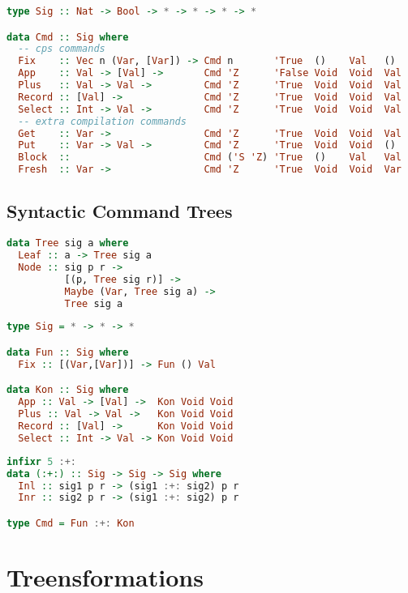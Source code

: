 \begin{lstlisting}[language=Haskell]
type Sig :: Nat -> Bool -> * -> * -> * -> *

data Cmd :: Sig where
  -- cps commands
  Fix    :: Vec n (Var, [Var]) -> Cmd n       'True  ()    Val   ()
  App    :: Val -> [Val] ->       Cmd 'Z      'False Void  Void  Val 
  Plus   :: Val -> Val ->         Cmd 'Z      'True  Void  Void  Val
  Record :: [Val] ->              Cmd 'Z      'True  Void  Void  Val
  Select :: Int -> Val ->         Cmd 'Z      'True  Void  Void  Val
  -- extra compilation commands
  Get    :: Var ->                Cmd 'Z      'True  Void  Void  Val
  Put    :: Var -> Val ->         Cmd 'Z      'True  Void  Void  ()
  Block  ::                       Cmd ('S 'Z) 'True  ()    Val   Val
  Fresh  :: Var ->                Cmd 'Z      'True  Void  Void  Var
\end{lstlisting}

\subsection{\label{subsection:syntree}Syntactic Command Trees}

\begin{lstlisting}[language=Haskell]
data Tree sig a where
  Leaf :: a -> Tree sig a
  Node :: sig p r ->
          [(p, Tree sig r)] ->
          Maybe (Var, Tree sig a) ->
          Tree sig a
\end{lstlisting}

\begin{lstlisting}[language=Haskell]
type Sig = * -> * -> *

data Fun :: Sig where
  Fix :: [(Var,[Var])] -> Fun () Val

data Kon :: Sig where
  App :: Val -> [Val] ->  Kon Void Void
  Plus :: Val -> Val ->   Kon Void Void
  Record :: [Val] ->      Kon Void Void
  Select :: Int -> Val -> Kon Void Void
\end{lstlisting}

\begin{lstlisting}[language=Haskell]
infixr 5 :+:
data (:+:) :: Sig -> Sig -> Sig where
  Inl :: sig1 p r -> (sig1 :+: sig2) p r
  Inr :: sig2 p r -> (sig1 :+: sig2) p r

type Cmd = Fun :+: Kon
\end{lstlisting}

\section{\label{section:treensforms}Treensformations}

